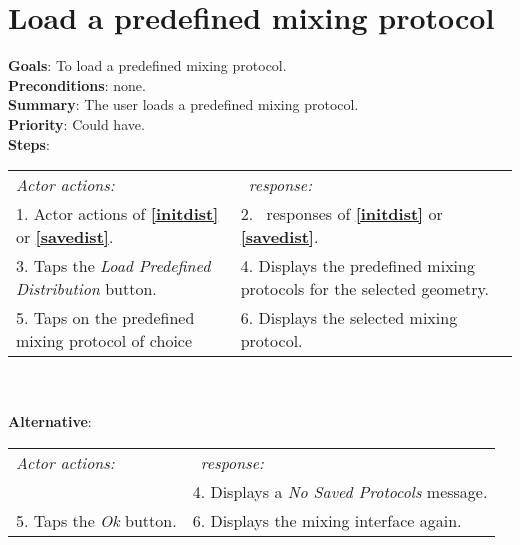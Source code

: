   \section{Load a predefined mixing protocol}
  \label{loadpredprot}
  \textbf{Goals}: To load a predefined mixing protocol.\\
  \textbf{Preconditions}: none.\\
  \textbf{Summary}: The user loads a predefined mixing protocol.\\
  \textbf{Priority}: Could have.\\
  \textbf{Steps}: \\
  \begin{tabular}{ p{} p{} }
  	\emph{Actor actions:} & \emph{\projectname\ response:} \\
  	1. Actor actions of \textbf{\ref{initdist}} or  \textbf{\ref{savedist}}. & 2. \projectname\ responses of \textbf{\ref{initdist}} or  \textbf{\ref{savedist}}. \\
	3. Taps the \emph{Load Predefined Distribution} button. & 4. Displays the predefined mixing protocols for the selected geometry. \\
	5. Taps on the predefined mixing protocol of choice & 6. Displays the selected mixing protocol. \\
  \end{tabular}
  	 \\
     \\\textbf{Alternative}: \\
    \begin{tabular}{ p{} p{} }
  	\emph{Actor actions:} & \emph{\projectname\ response:} \\
            & 4. Displays a \emph{No Saved Protocols} message. \\
    5. Taps the \emph{Ok} button. & 6. Displays the mixing interface again. \\
  \end{tabular}
    
